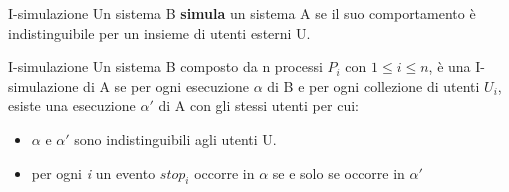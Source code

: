 \documentclass{beamer}
\begin{document}
    \begin{frame}{I-simulazione}
        Un sistema B \textbf{simula} un sistema A se il suo comportamento è indistinguibile per un insieme di utenti esterni U.

        \begin{block}{I-simulazione}
            Un sistema B composto da n processi $P_{i}$ con $1 \leq i \leq n$, è una I-simulazione di A se per ogni esecuzione $\alpha$ di B e per ogni collezione di utenti $U_{i}$, esiste una esecuzione $\alpha'$ di A con gli stessi utenti per cui:
            \begin{itemize}
                \item $\alpha$ e $\alpha'$ sono indistinguibili agli utenti U. %
                \item per ogni \textit{i} un evento $stop_{i}$ occorre in $\alpha$ se e solo se occorre in $\alpha'$
            \end{itemize}
        \end{block}

    \end{frame}
\end{document}
